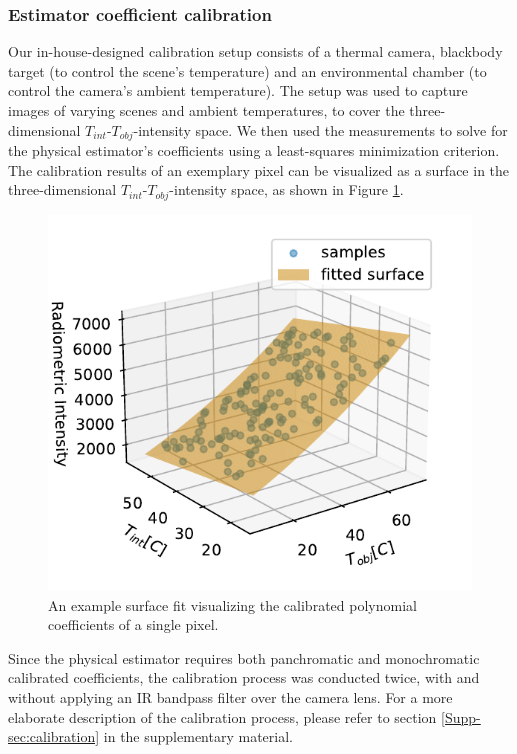 \subsubsection{Estimator coefficient calibration} \label{subsubsec:calibration}
Our in-house-designed calibration setup consists of a thermal camera, blackbody target (to control the scene's temperature) and an environmental chamber (to control the camera's ambient temperature).
The setup was used to capture images of varying scenes and ambient temperatures, to cover the three-dimensional $T_\mathit{int}$-$T_\mathit{obj}$-intensity space.
We then used the measurements to solve for the physical estimator's coefficients using a least-squares minimization criterion.
The calibration results of an exemplary pixel can be visualized as a surface in the three-dimensional $T_\mathit{int}$-$T_\mathit{obj}$-intensity space, as shown in Figure \ref{physical_model_fit}.
\begin{figure}
  \centering
  \includegraphics[width=\linewidth]{../figs/methods/physical_model_tight.pdf}
  \caption{An example surface fit visualizing the calibrated polynomial coefficients of a single pixel.}
  \label{physical_model_fit}
\end{figure}
Since the physical estimator requires both panchromatic and monochromatic calibrated coefficients, the calibration process was conducted twice, with and without applying an IR bandpass filter over the camera lens.
For a more elaborate description of the calibration process, please refer to section \ref{Supp-sec:calibration} in the supplementary material.

